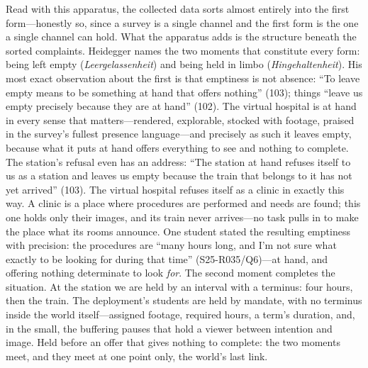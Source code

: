 Read with this apparatus, the collected data sorts almost
entirely into the first form---honestly so, since a survey is a
single channel and the first form is the one a single channel can
hold. What the apparatus adds is the structure beneath the sorted
complaints. Heidegger names the two moments that constitute every
form: being left empty (\textit{Leergelassenheit}) and being held in
limbo (\textit{Hingehaltenheit}). His most exact observation about the
first is that emptiness is not absence: ``To leave empty means to be
something at hand that offers nothing'' (103); things ``leave us empty
precisely because they are at hand'' (102). The virtual hospital is at
hand in every sense that matters---rendered, explorable, stocked with
footage, praised in the survey's fullest presence language---and
precisely as such it leaves empty, because what it puts at hand offers
everything to see and nothing to complete. The station's refusal even
has an address: ``The station at hand refuses itself to us as a
station and leaves us empty because the train that belongs to it has
not yet arrived'' (103). The virtual hospital refuses itself as a
clinic in exactly this way. A clinic is a place where procedures are
performed and needs are found; this one holds only their images, and
its train never arrives---no task pulls in to make the place what its
rooms announce. One student stated the resulting emptiness with
precision: the procedures are ``many hours long, and I'm not sure what
exactly to be looking for during that time'' (S25-R035/Q6)---at hand,
and offering nothing determinate to look \textit{for}. The second
moment completes the situation. At the station we are held by an
interval with a terminus: four hours, then the train. The deployment's
students are held by mandate, with no terminus inside the world
itself---assigned footage, required hours, a term's duration, and, in
the small, the buffering pauses that hold a viewer between intention
and image. Held before an offer that gives nothing to complete: the
two moments meet, and they meet at one point only, the world's last
link.

